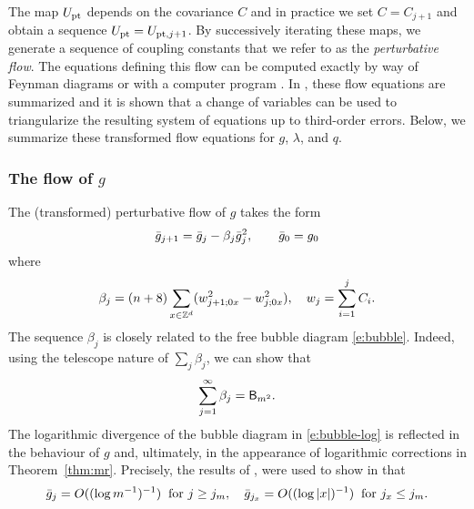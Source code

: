 The map $U_{\rm pt}$ depends on the covariance $C$ and
in practice we set $C = C_{j+1}$ and obtain a sequence $U_{\rm pt} = U_{\mathrm{pt},j+1}$.
By successively iterating these maps, we generate a sequence of coupling constants that
we refer to as the \emph{perturbative flow}. The equations defining this flow can be
computed exactly by way of Feynman diagrams or with a computer program \cite{BBS-rg-ptsoft}.
In \cite{BBS-rg-pt}, these flow equations are summarized and it is shown that a change of
variables can be used to triangularize the resulting system of equations up to third-order
errors. Below, we summarize these transformed flow equations for $g$, $\lambda$, and $q$.

\subsubsection{The flow of \texorpdfstring{$g$}{g}}

The (transformed) perturbative flow of $g$ takes the form
\begin{equation}
\label{e:gbar}
\bar{g}_{j+1}
	=
\bar{g}_j - \beta_j  \bar{g}_j^{2}, \qquad \bar{g}_0
	=
g_0
\end{equation}
where
\begin{equation}
\beta_j = (n + 8) \sum_{x\in{ {{\mathbb Z}}^d }} (w_{j+1;0x}^2 - w_{j;0x}^2),
	\quad
w_j = \sum_{i=1}^j C_i.
\end{equation}
The sequence $\beta_j$ is closely related to the free bubble diagram
\eqref{e:bubble}. Indeed, using the telescope nature of $\sum_j \beta_j$,
we can show that
\begin{equation}
\sum_{j=1}^\infty \beta_j
	=
{\sf B}_{m^2}.
\end{equation}
The logarithmic divergence of the bubble diagram in \eqref{e:bubble-log} is
reflected in the behaviour of $g$ and, ultimately, in the appearance of logarithmic
corrections in Theorem~\ref{thm:mr}. Precisely, the results of \cite{BBS-rg-flow},
were used to show in
\cite[Proposition~\ref{log-prop:approximate-flow}]{BBS-saw4-log}
that
\begin{equation}
\label{e:gjxgjmbd}
\bar{g}_{j}
	=
O((\log m^{-1})^{-1}) \;\; \text{for $j \geq j_m$},
	\quad
\bar{g}_{j_x}
	=
O((\log |x|)^{-1}) \;\; \text{for $j_x \leq j_m$.}
\end{equation}


